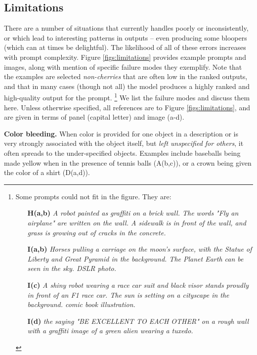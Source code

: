 \subsection{Limitations}
\label{secs:limitations}

There are a number of situations that \bdraw currently handles poorly or inconsistently, or which lead to interesting patterns in outputs -- even producing some bloopers (which can at times be delightful). The likelihood of all of these errors increases with prompt complexity. Figure \ref{figs:limitations} provides example prompts and images, along with mention of specific failure modes they exemplify. Note that the examples are selected \textit{non-cherries} that are often low in the ranked outputs, and that in many cases (though not all) the model produces a highly ranked and high-quality output for the prompt. \footnote{Some prompts could not fit in the figure. They are: \begin{itemize}[itemsep=0.5pt]
    \item[\textbf{H(a,b)}] \textit{A robot painted as graffiti on a brick wall. The words "Fly an airplane" are written on the wall. A sidewalk is in front of the wall, and grass is growing out of cracks in the concrete.}
    \item[\textbf{I(a,b)}] \textit{Horses pulling a carriage on the moon's surface, with the Statue of Liberty and Great Pyramid in the background. The Planet Earth can be seen in the sky. DSLR photo.}
    \item[\textbf{I(c)}] \textit{A shiny robot wearing a race car suit and black visor stands proudly in front of an F1 race car. The sun is setting on a cityscape in the background. comic book illustration.}
    \item[\textbf{I(d)}] \textit{the saying "BE EXCELLENT TO EACH OTHER" on a rough wall with a graffiti image of a green alien wearing a tuxedo.} \end{itemize}} We list the failure modes and discuss them here. Unless otherwise specified, all references are to Figure \ref{figs:limitations}, and are given in terms of panel (capital letter) and image (a-d).
 


\textbf{Color bleeding.} When color is provided for one object in a description or is very strongly associated with the object itself, but \textit{left unspecified for others}, it often spreads to the under-specified objects. Examples include baseballs being made yellow when in the presence of tennis balls (A(b,c)), or a crown being given the color of a shirt (D(a,d)).

